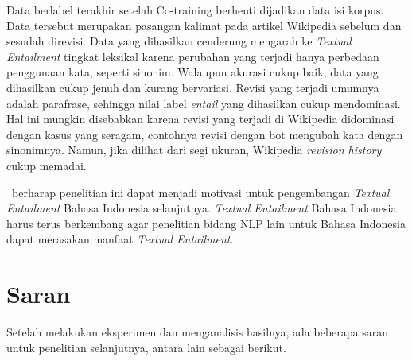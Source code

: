 Data berlabel terakhir setelah Co-training berhenti dijadikan data isi korpus. Data tersebut merupakan pasangan kalimat pada artikel Wikipedia sebelum dan sesudah direvisi. Data yang dihasilkan cenderung mengarah ke \textit{Textual Entailment} tingkat leksikal karena perubahan yang terjadi hanya perbedaan penggunaan kata, seperti sinonim. Walaupun akurasi cukup baik, data yang dihasilkan cukup jenuh dan kurang bervariasi. Revisi yang terjadi umumnya adalah parafrase, sehingga nilai label \textit{entail} yang dihasilkan cukup mendominasi. Hal ini mungkin disebabkan karena revisi yang terjadi di Wikipedia didominasi dengan kasus yang seragam, contohnya revisi dengan bot mengubah kata dengan sinonimnya. Namun, jika dilihat dari segi ukuran, Wikipedia \textit{revision history} cukup memadai.

\Saya~berharap penelitian ini dapat menjadi motivasi untuk pengembangan \textit{Textual Entailment} Bahasa Indonesia selanjutnya. \textit{Textual Entailment} Bahasa Indonesia harus terus berkembang agar penelitian bidang NLP lain untuk Bahasa Indonesia dapat merasakan manfaat \textit{Textual Entailment}.

\section{Saran}
Setelah melakukan eksperimen dan menganalisis hasilnya, ada beberapa saran untuk penelitian selanjutnya, antara lain sebagai berikut.

